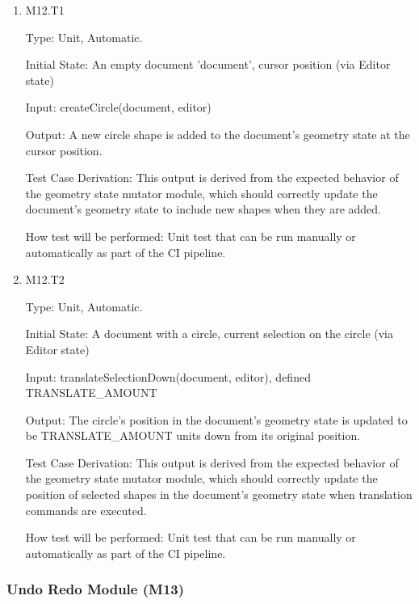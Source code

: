 \documentclass[12pt, titlepage]{article}
\begin{document}
\begin{enumerate}

\item{M12.T1\\}

Type: Unit, Automatic.

Initial State: An empty document 'document', cursor position (via Editor state)

Input: createCircle(document, editor)

Output: A new circle shape is added to the document's geometry state at the cursor position.

Test Case Derivation:
This output is derived from the expected behavior of the geometry state mutator module, which
    should correctly update the document's geometry state to include new shapes when they are added.

How test will be performed:
Unit test that can be run manually or automatically as part of the CI pipeline.


\item{M12.T2\\}

Type: Unit, Automatic.

Initial State: A document with a circle, current selection on the circle (via Editor state)

Input: translateSelectionDown(document, editor), defined TRANSLATE\_AMOUNT

Output: The circle's position in the document's geometry state is updated to be TRANSLATE\_AMOUNT units down from its original position.

Test Case Derivation:
This output is derived from the expected behavior of the geometry state mutator module, which
    should correctly update the position of selected shapes in the document's geometry state when translation commands are executed.

How test will be performed:
Unit test that can be run manually or automatically as part of the CI pipeline.
\end{enumerate}


\subsubsection{Undo Redo Module (M13)}
\end{document}
